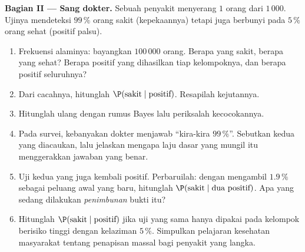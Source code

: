 \begin{problem}
\medskip
\noindent\textbf{Bagian II --- Sang dokter.}
Sebuah penyakit menyerang $1$ orang dari $1\,000$. Ujinya mendeteksi
$99\,\%$ orang sakit (kepekaannya) tetapi juga berbunyi pada $5\,\%$
orang sehat (positif palsu).
\begin{enumerate}[resume]
  \item Frekuensi alaminya: bayangkan $100\,000$ orang. Berapa
        yang sakit, berapa yang sehat? Berapa positif
        yang dihasilkan tiap kelompoknya, dan berapa positif
        seluruhnya?
  \item Dari cacahnya, hitunglah
        $\P(\text{sakit} \mid \text{positif})$. Resapilah
        kejutannya.
  \item Hitunglah ulang dengan rumus Bayes lalu periksalah
        kecocokannya.
  \item Pada survei, kebanyakan dokter menjawab ``kira-kira
        $99\,\%$''. Sebutkan kedua 
        yang diacaukan, lalu jelaskan mengapa laju dasar yang mungil
        itu menggerakkan jawaban yang benar.
  \item Uji kedua yang  juga kembali positif.
        Perbaruilah: dengan mengambil $1.9\,\%$ sebagai peluang awal yang baru, hitunglah
        $\P(\text{sakit} \mid \text{dua positif})$. Apa yang sedang dilakukan
        \emph{penimbunan} bukti itu?
  \item Hitunglah $\P(\text{sakit} \mid \text{positif})$ jika
        uji yang sama hanya dipakai pada kelompok berisiko tinggi dengan
        kelaziman $5\,\%$. Simpulkan pelajaran kesehatan masyarakat
        tentang penapisan massal bagi penyakit yang langka.
\end{enumerate}


\end{problem}

